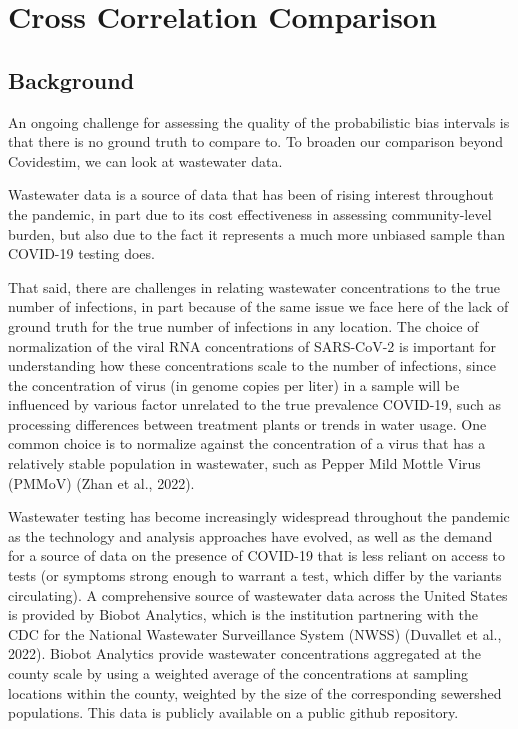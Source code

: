 \documentclass[12pt,twoside]{smiththesis}
\begin{document}
\newpage

\hypertarget{cross-correlation-comparison}{%
\section{Cross Correlation Comparison}\label{cross-correlation-comparison}}

\hypertarget{background-1}{%
\subsection{Background}\label{background-1}}

An ongoing challenge for assessing the quality of the probabilistic bias intervals is that there is no ground truth to compare to. To broaden our comparison beyond Covidestim, we can look at wastewater data.

Wastewater data is a source of data that has been of rising interest throughout the pandemic, in part due to its cost effectiveness in assessing community-level burden, but also due to the fact it represents a much more unbiased sample than COVID-19 testing does.

That said, there are challenges in relating wastewater concentrations to the true number of infections, in part because of the same issue we face here of the lack of ground truth for the true number of infections in any location. The choice of normalization of the viral RNA concentrations of SARS-CoV-2 is important for understanding how these concentrations scale to the number of infections, since the concentration of virus (in genome copies per liter) in a sample will be influenced by various factor unrelated to the true prevalence COVID-19, such as processing differences between treatment plants or trends in water usage. One common choice is to normalize against the concentration of a virus that has a relatively stable population in wastewater, such as Pepper Mild Mottle Virus (PMMoV) (Zhan et al., 2022).

Wastewater testing has become increasingly widespread throughout the pandemic as the technology and analysis approaches have evolved, as well as the demand for a source of data on the presence of COVID-19 that is less reliant on access to tests (or symptoms strong enough to warrant a test, which differ by the variants circulating). A comprehensive source of wastewater data across the United States is provided by Biobot Analytics, which is the institution partnering with the CDC for the National Wastewater Surveillance System (NWSS) (Duvallet et al., 2022). Biobot Analytics provide wastewater concentrations aggregated at the county scale by using a weighted average of the concentrations at sampling locations within the county, weighted by the size of the corresponding sewershed populations. This data is publicly available on a public github repository.
\end{document}
